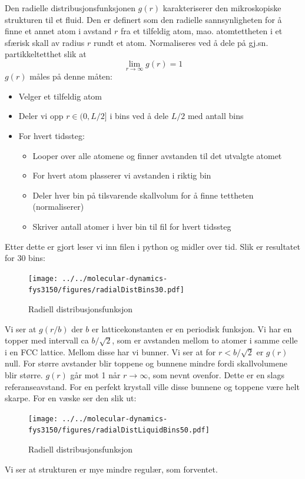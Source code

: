 \documentclass[english, a4paper]{article}
\begin{document}
\noindent
Den radielle distribusjonsfunksjonen $g(r)$ karakteriserer den mikroskopiske strukturen til et fluid.
Den er definert som den radielle sannsynligheten for å finne et annet atom i avstand $r$ fra et 
tilfeldig atom, mao. atomtettheten i et sfærisk skall av radius $r$ rundt et atom. 
Normaliseres ved å dele på gj.sn. partikkeltetthet slik at
\begin{equation}
 \lim_{r\to\infty} g(r) = 1
\end{equation}
$g(r)$ måles på denne måten:
\begin{itemize}
 \item Velger et tilfeldig atom
 \item Deler vi opp $r \in (0,L/2]$ i bins ved å dele $L/2$ med antall bins
 \item For hvert tidssteg:
 \begin{itemize}
   \item Looper over alle atomene og finner avstanden til det utvalgte atomet
   \item For hvert atom plasserer vi avstanden i riktig bin 
   \item Deler hver bin på tilsvarende skallvolum for å finne tettheten (normaliserer)
   \item Skriver antall atomer i hver bin til fil for hvert tidssteg
 \end{itemize}
\end{itemize}
Etter dette er gjort leser vi inn filen i python og midler over tid. 
Slik er resultatet for 30 bins:
\begin{figure}[H]
  \begin{center}
  \texttt{[image: ../../molecular-dynamics-fys3150/figures/radialDistBins30.pdf]}
  \caption{Radiell distribusjonsfunksjon}
  \label{fig:fig5}
  \end{center}
\end{figure}
Vi ser at $g(r/b)$ der $b$ er latticekonstanten er en periodisk funksjon. Vi har en topper med
intervall ca $b/\sqrt{2}$, som er avstanden mellom to atomer i samme celle i en FCC lattice. 
Mellom disse har vi bunner. Vi ser at for $r < b/\sqrt{2}$ er $g(r)$ null. For større avstander
blir toppene og bunnene mindre fordi skallvolumene blir større. $g(r)$ går mot 1 når
$r \to \infty$, som nevnt ovenfor. Dette er en slags referanseavstand. 
For en perfekt krystall ville disse bunnene og toppene være helt skarpe. 
For en væske ser den slik ut:
\begin{figure}[H]
  \begin{center}
  \texttt{[image: ../../molecular-dynamics-fys3150/figures/radialDistLiquidBins50.pdf]}
  \caption{Radiell distribusjonsfunksjon}
  \label{fig:fig5}
  \end{center}
\end{figure}
Vi ser at strukturen er mye mindre regulær, som forventet. 
\end{document}
